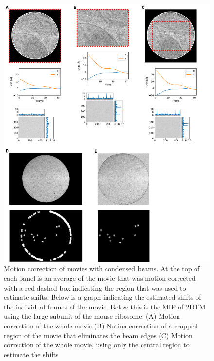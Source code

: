 \documentclass[
]{article}
\newenvironment{fignos:tagged-figure}[1][]{
    \let\oldthefigure\thefigure
    \let\oldtheHfigure\theHfigure
    \renewcommand{\thefigure}{#1}
    \renewcommand{\theHfigure}{#1}
  }{
    \let\thefigure\oldthefigure
    \let\theHfigure\oldtheHfigure
    \addtocounter{figure}{-1}
  }
\begin{document}
\begin{fignos:tagged-figure}

\begin{figure}
\hypertarget{fig:crop_unblur}{%
\centering
\includegraphics{figures/crop_unblur.png}
\caption{Motion correction of movies with condensed beams.
At the top of each panel is an average of the movie that was motion-corrected
with a red dashed box indicating the region that was used to estimate shifts.
Below is a graph indicating the estimated shifts of the individual frames of the
movie. Below this is the MIP of 2DTM using the large subunit of the mouse ribosome.
(A) Motion correction of the whole movie
(B) Notion correction of a cropped region of the movie that eliminates the beam
edges
(C) Motion correction of the whole movie, using only the central region to
estimate the shifts}\label{fig:crop_unblur}
}
\end{figure}

\end{fignos:tagged-figure}
\end{document}
